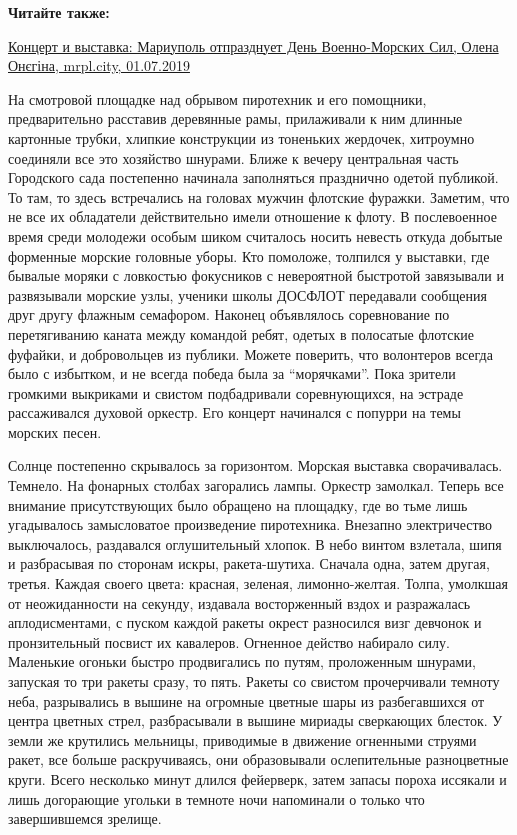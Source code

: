 \textbf{Читайте также:} 

\href{https://mrpl.city/news/view/kontsert-i-vystavka-mariupol-otprazdnuet-den-voenno-morskih-sil}{%
Концерт и выставка: Мариуполь отпразднует День Военно-Морских Сил, Олена Онєгіна, mrpl.city, 01.07.2019}

На смотровой площадке над обрывом пиротехник и его помощники, предварительно
расставив деревянные рамы, прилаживали к ним длинные картонные трубки, хлипкие
конструкции из тоненьких жердочек, хитроумно соединяли все это хозяйство
шнурами. Ближе к вечеру центральная часть Городского сада постепенно начинала
заполняться празднично одетой публикой. То там, то здесь встречались на головах
мужчин флотские фуражки. Заметим, что не все их обладатели действительно имели
отношение к флоту. В послевоенное время среди молодежи особым шиком считалось
носить невесть откуда добытые форменные морские головные уборы. Кто помоложе,
толпился у выставки, где бывалые моряки с ловкостью фокусников с невероятной
быстротой завязывали и развязывали морские узлы, ученики школы ДОСФЛОТ
передавали сообщения друг другу флажным семафором. Наконец объявлялось
соревнование по перетягиванию каната между командой ребят, одетых в полосатые
флотские фуфайки, и добровольцев из публики. Можете поверить, что волонтеров
всегда было с избытком, и не всегда победа была за \enquote{морячками}. Пока зрители
громкими выкриками и свистом подбадривали соревнующихся, на эстраде
рассаживался духовой оркестр. Его концерт начинался с попурри на темы морских
песен.

Солнце постепенно скрывалось за горизонтом. Морская выставка сворачивалась.
Темнело. На фонарных столбах загорались лампы. Оркестр замолкал. Теперь все
внимание присутствующих было обращено на площадку, где во тьме лишь угадывалось
замысловатое произведение пиротехника. Внезапно электричество выключалось,
раздавался оглушительный хлопок. В небо винтом взлетала, шипя и разбрасывая по
сторонам искры, ракета-шутиха. Сначала одна, затем другая, третья. Каждая
своего цвета: красная, зеленая, лимонно-желтая. Толпа, умолкшая от
неожиданности на секунду, издавала восторженный вздох и разражалась
аплодисментами, с пуском каждой ракеты окрест разносился визг девчонок и
пронзительный посвист их кавалеров. Огненное действо набирало силу. Маленькие
огоньки быстро продвигались по путям, проложенным шнурами, запуская то три
ракеты сразу, то пять. Ракеты со свистом прочерчивали темноту неба, разрывались
в вышине на огромные цветные шары из разбегавшихся от центра цветных стрел,
разбрасывали в вышине мириады сверкающих блесток. У земли же крутились
мельницы, приводимые в движение огненными струями ракет, все больше
раскручиваясь, они образовывали ослепительные разноцветные круги. Всего
несколько минут длился фейерверк, затем запасы пороха иссякали и лишь
догорающие угольки в темноте ночи напоминали о только что завершившемся
зрелище.


